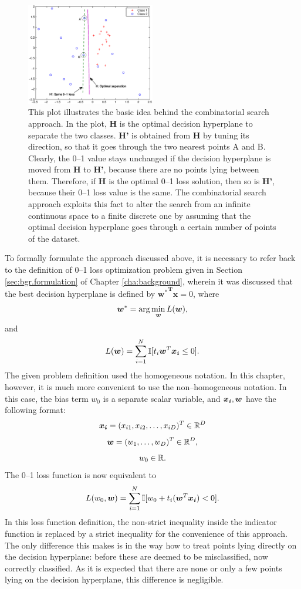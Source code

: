 \begin{figure}[here]
\includegraphics[width=0.50\textwidth]{images/fig41_intro.eps}
\caption{
This plot illustrates the basic idea behind the combinatorial search approach. In the plot, {\bf H} is the optimal decision hyperplane to separate the two classes. {\bf H'} is obtained from {\bf H} by tuning its direction, so that it goes through the two nearest points A and B. Clearly, the 0--1 value stays unchanged if the decision hyperplane is moved from {\bf H} to {\bf H'}, because there are no points lying between them. Therefore, if {\bf H} is the optimal 0--1 loss solution, then so is {\bf H'}, because their 0--1 loss value is the same. The combinatorial search approach exploits this fact to alter the search from an infinite continuous space to a finite discrete one by assuming that the optimal decision hyperplane goes through a certain number of points of the dataset.
}
\label{fig:cs_intro}
\end{figure}

To formally formulate the approach discussed above, it is necessary to refer back to the definition of 0--1 loss optimization problem given in Section \ref{sec:bgr.formulation} of Chapter \ref{cha:background}, wherein it was discussed that the best decision hyperplane is defined by $\boldsymbol{{w^*}^Tx}=0$, where 
$${\boldsymbol{w}}^* = \arg\min_{\boldsymbol{w}} L({\boldsymbol{w}}),$$ 
and 
$$L(\boldsymbol{w}) = \sum_{i=1}^N \mathbb{I} [t_i \boldsymbol{w}^T \boldsymbol{x_i} \leq 0].$$
The given problem definition used the homogeneous notation. In this chapter, however, it is much more convenient to use the non--homogeneous notation. In this case, the bias term $w_0$ is a separate scalar variable, and $\boldsymbol{x_i}, \boldsymbol{w}$ have the following format:
$$\boldsymbol{x_i} =  (x_{i1}, x_{i2}, \dots, x_{iD})^T \in \mathbb{R}^{D}$$
$$\boldsymbol{w} = (w_1, \dots, w_D)^T \in \mathbb{R}^{D},$$
$$w_0 \in \mathbb{R}.$$ 
The 0--1 loss function is now equivalent to 
\begin{equation}\label{eq:loss}
L(w_0,\boldsymbol{w}) = \sum_{i=1}^N \mathbb{I} [w_0 + t_i (\boldsymbol{w}^T \boldsymbol{x_i}) < 0].
\end{equation}
In this loss function definition, the non-strict inequality inside the indicator function is replaced by a strict inequality for the convenience of this approach. The only difference this makes is in the way how to treat points lying directly on the decision hyperplane: before these are deemed to be misclassified, now correctly classified. As it is expected that there are none or only a few points lying on the decision hyperplane, this difference is negligible. 

